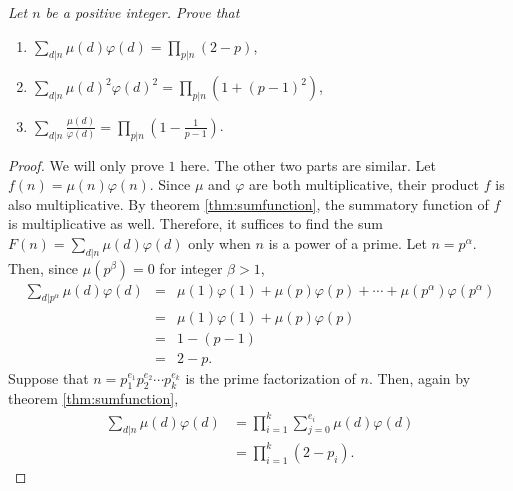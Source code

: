 \documentclass[12pt]{subfile}
\begin{document}
		\begin{theorem}\slshape
			Let $n$ be a positive integer. Prove that
			\begin{enumerate}
				\item $\displaystyle \sum_{d|n}\mu(d)\varphi(d) = \prod_{p|n} (2-p)$,
				\item $\displaystyle \sum_{d|n}\mu(d)^2\varphi(d)^2=\prod_{p|n}(1+(p-1)^2)$,
				\item $\displaystyle \sum_{d|n}\frac{\mu(d)}{\varphi(d)} = \prod_{p|n}\left(1-\frac{1}{p-1}\right)$.
			\end{enumerate}
		\end{theorem}

		\begin{proof}
			We will only prove $1$ here. The other two parts are similar. Let $f(n)=\mu(n)\varphi(n)$. Since $\mu$ and $\varphi$ are both multiplicative, their product $f$ is also multiplicative. By theorem \ref{thm:sumfunction}, the summatory function of $f$ is multiplicative as well. Therefore, it suffices to find the sum $F(n)=\sum\limits_{d|n}\mu(d)\varphi(d)$ only when $n$ is a power of a prime. Let $n=p^\alpha$. Then, since $\mu(p^\beta)=0$ for integer $\beta > 1$,
				\begin{eqnarray*}
				\sum\limits_{d|p^\alpha}\mu(d)\varphi(d)
					&=& \mu(1)\varphi(1) + \mu(p) \varphi(p) + \cdots + \mu(p^\alpha) \varphi(p^\alpha)\\
					&=& \mu(1)\varphi(1) + \mu(p) \varphi(p) \\
					&=& 1 - (p-1)\\
					&=& 2 - p.
				\end{eqnarray*}
			Suppose that $n=p_1^{e_1}p_2^{e_2} \cdots p_k^{e_k}$ is the prime factorization of $n$. Then, again by theorem \ref{thm:sumfunction},
			\begin{align*}
			\sum\limits_{d|n}\mu(d)\varphi(d) &= \prod_{i=1}^{k}\sum\limits_{j=0}^{e_i}\mu(d)\varphi(d)\\
			&= \prod_{i=1}^{k} (2-p_i).
			\end{align*}
		\end{proof}
\end{document}

